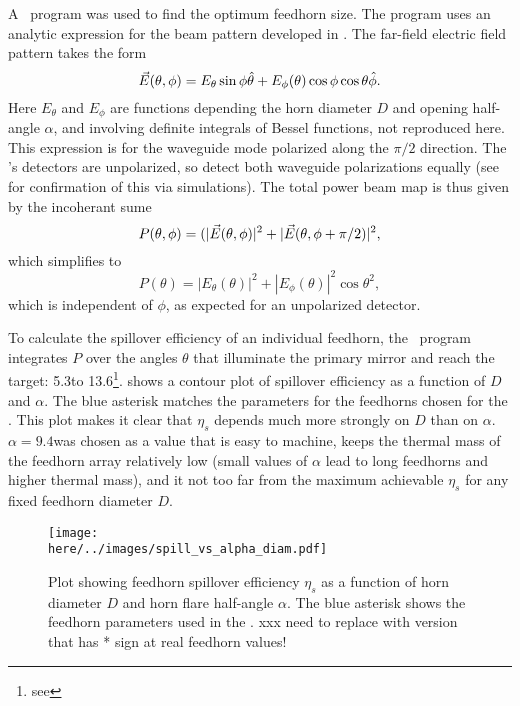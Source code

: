 A \MATLAB\ program was used to find the optimum feedhorn size.
The program uses an analytic expression for the beam pattern developed in \cite{green_radiation_2006,narasimhan_modes_1971,}.
The far-field electric field pattern takes the form
\begin{equation}
    \vec{E}(\theta,\phi) = E_{\theta} \sin{\phi} \hat{\theta} + E_{\phi}(\theta) \cos{\phi} \cos{\theta} \hat{\phi}.
\end{equation}
Here $E_{\theta}$ and $E_{\phi}$ are functions depending the horn diameter $D$ and opening half-angle $\alpha$, and involving definite integrals of Bessel functions, not reproduced here.
This expression is for the waveguide mode polarized along the $\pi/2$ direction.
The \Imager's detectors are unpolarized, so detect both waveguide polarizations equally (see  for confirmation of this via simulations).
The total power beam map is thus given by the incoherant sume
\begin{equation}
    P(\theta, \phi) = (|\vec{E}(\theta, \phi)|^2 + |\vec{E}(\theta, \phi+\pi/2)|^2,
\end{equation}
which simplifies to 
\begin{equation}
    P(\theta) = |E_{\theta}(\theta)|^2 + |E_{\phi}(\theta)|^2 \cos{\theta}^2,
\end{equation}
which is independent of $\phi$, as expected for an unpolarized detector.

To calculate the spillover efficiency of an individual feedhorn, the \MATLAB\ program integrates $P$ over the angles $\theta$ that illuminate the primary mirror and reach the target: 5.3\textdegree to 13.6\textdegree\footnote{see }.
 shows a contour plot of spillover efficiency as a function of $D$ and $\alpha$.
The blue asterisk matches the parameters for the feedhorns chosen for the \Imager.
This plot makes it clear that $\eta_s$ depends much more strongly on $D$ than on $\alpha$.
$\alpha = 9.4$\textdegree was chosen as a value that is easy to machine, keeps the thermal mass of the feedhorn array relatively low (small values of $\alpha$ lead to long feedhorns and higher thermal mass), and it not too far from the maximum achievable $\eta_s$ for any fixed feedhorn diameter $D$.

\begin{figure*}[th]
\centering
\texttt{[image: \\here/../images/spill\_vs\_alpha\_diam.pdf]}
\caption{Plot showing feedhorn spillover efficiency $\eta_s$ as a function of horn diameter $D$ and horn flare half-angle $\alpha$. The blue asterisk shows the feedhorn parameters used in the \Imager. xxx need to replace with version that has * sign at real feedhorn values!}
\label{fig:spill-vs-alpha-diam}
\end{figure*}

